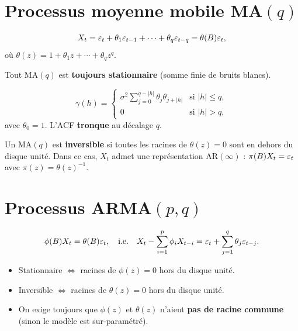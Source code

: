 \section{Processus moyenne mobile MA$(q)$}

\begin{definition}[MA$(q)$]
\[
X_t = \varepsilon_t + \theta_1\varepsilon_{t-1} + \cdots + \theta_q\varepsilon_{t-q} = \theta(B)\varepsilon_t,
\]
o\`u $\theta(z)=1+\theta_1 z+\cdots+\theta_q z^q$.
\end{definition}

\begin{theoreme}[Stationnarit\'e d'un MA$(q)$]
Tout MA$(q)$ est \textbf{toujours stationnaire} (somme finie de bruits blancs).
\end{theoreme}

\begin{theoreme}[ACF d'un MA$(q)$]
\[
\gamma(h) = \begin{cases}\sigma^2\sum_{j=0}^{q-|h|}\theta_j\theta_{j+|h|} & \text{si }|h|\leq q,\\0 & \text{si }|h|>q,\end{cases}
\]
avec $\theta_0=1$. L'ACF \textbf{tronque} au d\'ecalage $q$.
\end{theoreme}

\begin{definition}[Inversibilit\'e]
Un MA$(q)$ est \textbf{inversible} si toutes les racines de $\theta(z)=0$ sont en dehors du disque unit\'e. Dans ce cas, $X_t$ admet une repr\'esentation AR$(\infty)$ : $\pi(B)X_t=\varepsilon_t$ avec $\pi(z)=\theta(z)^{-1}$.
\end{definition}

\section{Processus ARMA$(p,q)$}

\begin{definition}[ARMA$(p,q)$]
\[
\phi(B)X_t = \theta(B)\varepsilon_t, \quad\text{i.e.}\quad X_t - \sum_{i=1}^p\phi_i X_{t-i} = \varepsilon_t + \sum_{j=1}^q\theta_j\varepsilon_{t-j}.
\]
\end{definition}

\begin{theoreme}
\begin{itemize}
\item Stationnaire $\iff$ racines de $\phi(z)=0$ hors du disque unit\'e.
\item Inversible $\iff$ racines de $\theta(z)=0$ hors du disque unit\'e.
\item On exige toujours que $\phi(z)$ et $\theta(z)$ n'aient \textbf{pas de racine commune} (sinon le mod\`ele est sur-param\'etr\'e).
\end{itemize}
\end{theoreme}

